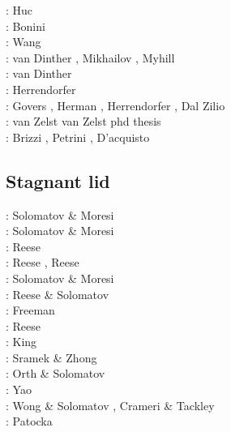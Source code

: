 \begin{scriptsize}
\nineteenninetyeight: Huc \etal \cite{huhc98}\\
\twothousandthree: Bonini \etal \cite{bocs03}\\
\twothousandtwelve: Wang \etal \cite{wahh12}\\
\twothousandthirteen: van Dinther \etal \cite{vagd13a,vagd13b}, Mikhailov \cite{milp13},
                      Myhill \cite{myhi13}\\
\twothousandfourteen: van Dinther \etal \cite{vamd14}\\
\twothousandfifteen: Herrendorfer \etal \cite{hevg15}\\
\twothousandeighteen: Govers \etal \cite{gofv18}, Herman \etal \cite{hefg18}, 
                      Herrendorfer \etal \cite{hegv18}, Dal Zilio \etal \cite{davg18}\\
\twothousandnineteen: van Zelst \etal \cite{vawg19} van Zelst phd thesis \cite{vanzelst}\\
\twothousandtwenty: Brizzi \etal \cite{brvf20}, Petrini \etal \cite{pegy20}, 
                    D'acquisto \etal \cite{dadm20}
\end{scriptsize}


\subsection{Stagnant lid} 

\begin{scriptsize}
\noindent
\nineteenninetysix: Solomatov \& Moresi \cite{somo96}\\
\nineteenninetyseven: Solomatov \& Moresi \cite{somo97}\\
\nineteenninetyeight: Reese \etal \cite{resm98}\\
\nineteenninetynine: Reese \etal \cite{resm99}, Reese \etal \cite{resb99}\\
\twothousand: Solomatov \& Moresi \cite{somo00}\\
\twothousandtwo: Reese \& Solomatov \cite{reso02}\\
\twothousandfour: Freeman \etal \cite{frmm04}\\
\twothousandfive: Reese \etal \cite{resb05}\\
\twothousandnine: King \cite{king09}\\
\twothousandten: Sramek \& Zhong \cite{srzh10}\\
\twothousandeleven: Orth \& Solomatov \cite{orso11}\\
\twothousandfourteen: Yao \etal \cite{yadl14}\\
\twothousandsixteen: Wong \& Solomatov \cite{woso16b}, Crameri \& Tackley \cite{crta16}\\
\twothousandseventeen: Patocka \etal \cite{pact17}
\end{scriptsize}


